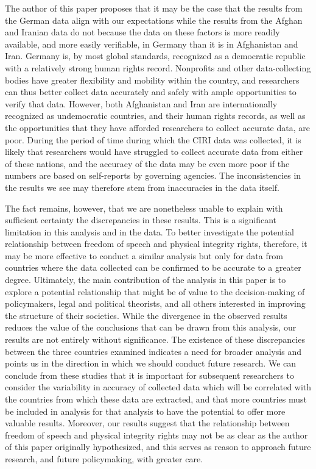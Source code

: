 \documentclass{article}
\begin{document}
The author of this paper proposes that it may be the case that the results from the German data align with our expectations while the results from the Afghan and Iranian data do not because the data on these factors is more readily available, and more easily verifiable, in Germany than it is in Afghanistan and Iran. Germany is, by most global standards, recognized as a democratic republic with a relatively strong human rights record. Nonprofits and other data-collecting bodies have greater flexibility and mobility within the country, and researchers can thus better collect data accurately and safely with ample opportunities to verify that data. However, both Afghanistan and Iran are internationally recognized as undemocratic countries, and their human rights records, as well as the opportunities that they have afforded researchers to collect accurate data, are poor. During the period of time during which the CIRI data was collected, it is likely that researchers would have struggled to collect accurate data from either of these nations, and the accuracy of the data may be even more poor if the numbers are based on self-reports by governing agencies. The inconsistencies in the results we see may therefore stem from inaccuracies in the data itself.

The fact remains, however, that we are nonetheless unable to explain with sufficient certainty the discrepancies in these results. This is a significant limitation in this analysis and in the data. To better investigate the potential relationship between freedom of speech and physical integrity rights, therefore, it may be more effective to conduct a similar analysis but only for data from countries where the data collected can be confirmed to be accurate to a greater degree.
Ultimately, the main contribution of the analysis in this paper is to explore a potential relationship that might be of value to the decision-making of policymakers, legal and political theorists, and all others interested in improving the structure of their societies. While the divergence in the observed results reduces the value of the conclusions that can be drawn from this analysis, our results are not entirely without significance. The existence of these discrepancies between the three countries examined indicates a need for broader analysis and points us in the direction in which we should conduct future research. We can conclude from these studies that it is important for subsequent researchers to consider the variability in accuracy of collected data which will be correlated with the countries from which these data are extracted, and that more countries must be included in analysis for that analysis to have the potential to offer more valuable results. Moreover, our results suggest that the relationship between freedom of speech and physical integrity rights may not be as clear as the author of this paper originally hypothesized, and this serves as reason to approach future research, and future policymaking, with greater care. 
\end{document}

